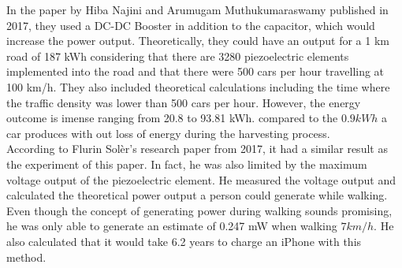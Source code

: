 In the paper by Hiba Najini and Arumugam Muthukumaraswamy published in 2017, they used a DC-DC Booster in addition to the capacitor, which would increase the power output. Theoretically, they could have an output for a 1 km road of 187 kWh considering that there are 3280 piezoelectric elements implemented into the road and that there were 500 cars per hour travelling at 100 km/h. They also included theoretical calculations including the time where the traffic density was lower than 500 cars per hour. However, the energy outcome is imense ranging from 20.8 to 93.81 kWh. compared to the $0.9kWh$ a car produces with out loss of energy during the harvesting process. \cite{Najini2017} \\
According to Flurin Solèr's research paper from 2017, it had a similar result as the experiment of this paper. In fact, he was also limited by the maximum voltage output of the piezoelectric element. He measured the voltage output and calculated the theoretical power output a person could generate while walking. Even though the concept of generating power during walking sounds promising, he was only able to generate an estimate of 0.247 mW when walking $7km/h$. He also calculated that it would take 6.2 years to charge an iPhone with this method.\cite{Soler2017}\\